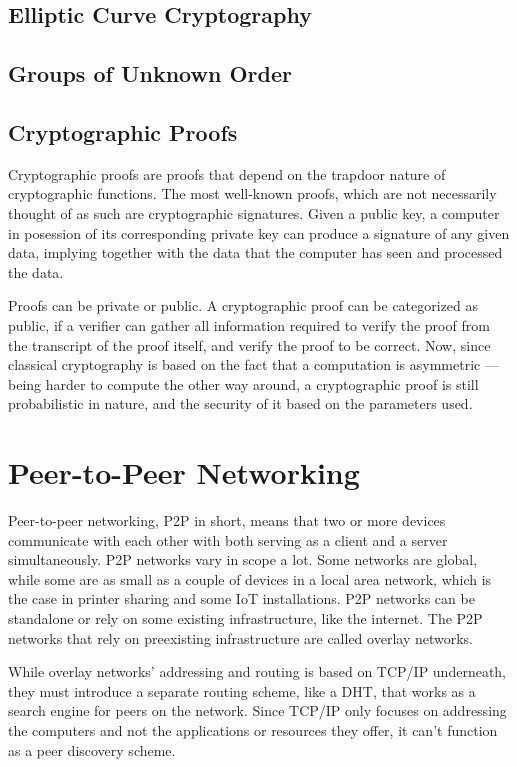 \section{Elliptic Curve Cryptography}

\section{Groups of Unknown Order}

\section{Cryptographic Proofs}
Cryptographic proofs are proofs that depend on the trapdoor nature of cryptographic functions. The most well-known proofs, which are not necessarily thought of as such are cryptographic signatures. Given a public key, a computer in posession of its corresponding private key can produce a signature of any given data, implying together with the data that the computer has seen and processed the data.

Proofs can be private or public. A cryptographic proof can be categorized as public, if a verifier can gather all information required to verify the proof from the transcript of the proof itself, and verify the proof to be correct. Now, since classical cryptography is based on the fact that a computation is asymmetric --- being harder to compute the other way around, a cryptographic proof is still probabilistic in nature, and the security of it based on the parameters used.
						
\chapter{Peer-to-Peer Networking}
\label{Peer-to-Peer Networking}
Peer-to-peer networking, P2P in short, means that two or more devices communicate with each other with both serving as a client and a server simultaneously. P2P networks vary in scope a lot. Some networks are global, while some are as small as a couple of devices in a local area network, which is the case in printer sharing and some IoT installations. P2P networks can be standalone or rely on some existing infrastructure, like the internet. The P2P networks that rely on preexisting infrastructure are called overlay networks.

While overlay networks' addressing and routing is based on TCP/IP underneath, they must introduce a separate routing scheme, like a DHT, that works as a search engine for peers on the network. Since TCP/IP only focuses on addressing the computers and not the applications or resources they offer, it can't function as a peer discovery scheme.

